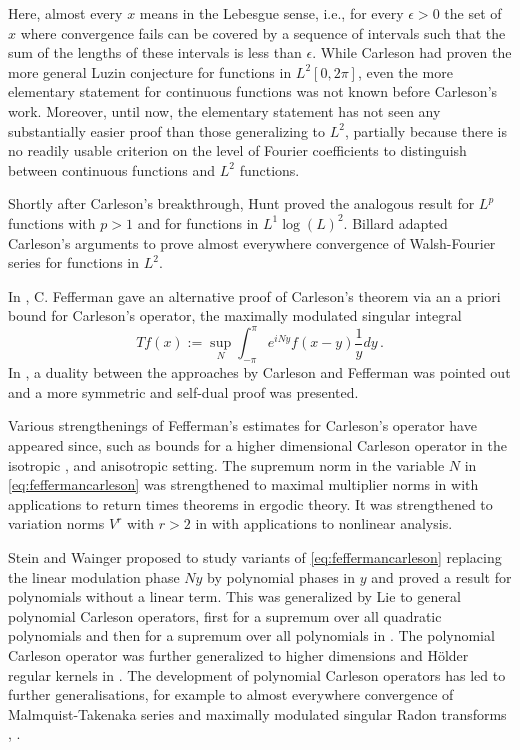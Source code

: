 
Here, almost every $x$ means in the Lebesgue sense, i.e., for every $\epsilon>0$ the set of $x$ where convergence fails can be covered by a sequence of intervals
such that the sum of the lengths of these
intervals is less than $\epsilon$. While Carleson had proven the more general Luzin conjecture for functions in $L^2[0,2\pi]$, even the more elementary statement for continuous functions was not known before Carleson's work.
Moreover, until now, the elementary statement has not seen any substantially easier proof than those generalizing to $L^2$,
partially because there is no readily usable criterion on the level of
Fourier coefficients to distinguish between continuous functions and $L^2$ functions.


Shortly after Carleson's breakthrough, Hunt \cite{MR238019} proved the analogous result for $L^p$ functions
with $p>1$ and for functions in $L^1\log(L)^2$.
Billard \cite{MR217510} adapted Carleson's arguments to prove almost everywhere convergence of Walsh-Fourier series
for functions in $L^2$.


In \cite{fefferman}, C. Fefferman gave an alternative proof of Carleson's theorem via an a priori
bound for Carleson's operator, the maximally modulated singular integral
\begin{equation}\label{eq:feffermancarleson}
    Tf(x):=\sup_{N} \int_{-\pi}^\pi e^{iNy}f(x-y)\frac 1y {dy}\, .
\end{equation}
In \cite{lacey-thiele}, a duality
between the approaches by Carleson and Fefferman was pointed out and a more symmetric and self-dual proof was presented.


Various strengthenings of Fefferman's estimates for Carleson's operator have appeared since, such as bounds for a higher dimensional Carleson operator in the isotropic
\cite{MR336222}, \cite{MR2007237} and anisotropic \cite{MR4014801} setting.
The supremum norm in the variable $N$ in \eqref{eq:feffermancarleson} was strengthened
to maximal multiplier norms in \cite{MR2420509} with applications to return times theorems in ergodic theory.
It was strengthened to variation norms $V^r$ with $r>2$ in \cite{MR2881301} with applications to nonlinear analysis.

Stein and Wainger \cite{stein-wainger} proposed to study variants of \eqref{eq:feffermancarleson} replacing the
linear modulation phase $Ny$ by polynomial phases in $y$ and proved a result for polynomials without a linear term.
This was generalized by Lie to general polynomial Carleson operators, first for a supremum over all quadratic
polynomials \cite{lie-quadratic} and then for a supremum over all polynomials in \cite{lie-polynomial}.
The polynomial Carleson operator was further generalized to higher dimensions and H\"older regular kernels in \cite{zk-polynomial}.
The development of polynomial Carleson operators has led to further generalisations, for example to almost everywhere convergence of Malmquist-Takenaka series
\cite{mnatsakanyan} and maximally modulated singular Radon transforms \cite{ramos}, \cite{becker2024maximal}.

